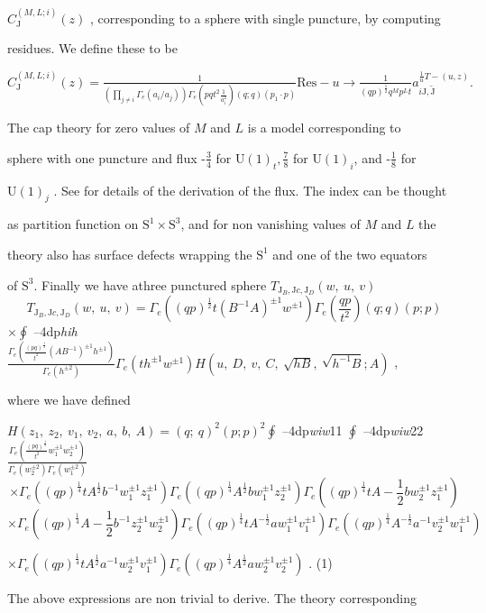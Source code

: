 \documentclass[a4paper,12pt]{article}
\begin{document}
$C_{\mathrm{J}}^{(M,L;i)}(z)$ , corresponding to a sphere with single puncture, by computing

residues. We define these to be

$C_{\mathrm{J}}^{(M,L;i)}(z)=\displaystyle \frac{1}{(\prod_{j\neq i}\Gamma_{e}(a_{i}/a_{j}))\Gamma_{e}(pqt^{2}\frac{1}{a_{i}^{2}})(q;q)(p_{1}\cdot p)}\mathrm{R}\mathrm{e}\mathrm{s} -u\displaystyle \rightarrow\frac{1}{(qp)^{\frac{1}{2}}q^{M}p^{L}t}a_{i\mathrm{J},\tilde{\mathrm{J}}}^{\frac{1}{u}T-(u,z)}.$

The cap theory for zero values of $M$ and $L$ is a model corresponding to

sphere with one puncture and flux -$\displaystyle \frac{3}{4}$ for $\mathrm{U}(1)_{t}, \displaystyle \frac{7}{8}$ for $\mathrm{U}(1)_{i}$, and -$\displaystyle \frac{1}{8}$ for

$\mathrm{U}(1)_{j}$ . See for details of the derivation of the flux. The index can be thought

as partition function on $\mathrm{S}^{1}\times \mathrm{S}^{3}$, and for non vanishing values of $M$ and $L$ the

theory also has surface defects wrapping the $\mathrm{S}^{1}$ and one of the two equators

of $\mathrm{S}^{3}$. Finally we have athree punctured sphere $T_{\mathrm{J}_{B},\mathrm{J}c,\mathrm{J}_{D}}(w,\ u,\ v)$
$$
T_{\mathrm{J}_{B},\mathrm{J}c,\mathrm{J}_{D}}(w,\ u,\ v)=\Gamma_{e}((qp)^{\frac{1}{2}}t(B^{-1}A)^{\pm 1}w^{\pm 1})\Gamma_{e}(\frac{qp}{t^{2}})(q;q)(p;p)
$$
$\displaystyle \times\oint$ --4dp{\it hih} $\displaystyle \frac{\Gamma_{e}(\frac{(pq)^{\frac{1}{2}}}{t^{2}}(AB^{-1})^{\pm 1}h^{\pm 1})}{\Gamma_{e}(h^{\pm 2})}\Gamma_{e}(th^{\pm 1}w^{\pm 1})H(u,\ D,\ v,\ C,\ \sqrt{hB},\ \sqrt{h^{-1}B};A)$ ,

where we have defined

$H (z_{1},\ z_{2},\ v_{1},\ v_{2},\ a,\ b,\ A) = (q;\ q)^{2}(p;p)^{2} \displaystyle \oint$ --4dp{\it wiw}11 $\displaystyle \oint$ --4dp{\it wiw}22 $\displaystyle \frac{\Gamma_{e}(\frac{(pq)^{\frac{1}{2}}}{t^{2}}w_{1}^{\pm 1}w_{2}^{\pm 1})}{\Gamma_{e}(w_{2}^{\pm 2})\Gamma_{e}(w_{1}^{\pm 2})}$
$$
\times\Gamma_{e}((qp)^{\frac{1}{4}}tA^{\frac{1}{2}}b^{-1}w_{1}^{\pm 1}z_{1}^{\pm 1})\Gamma_{e}((qp)^{\frac{1}{4}}A^{\frac{1}{2}}bw_{1}^{\pm 1}z_{2}^{\pm 1})\Gamma_{e}((qp)^{\frac{1}{4}}tA-\frac{1}{2}bw_{2}^{\pm 1}z_{1}^{\pm 1})
$$
$$
\times\Gamma_{e}((qp)^{\frac{1}{4}}A-\frac{1}{2}b^{-1}z_{2}^{\pm 1}w_{2}^{\pm 1})\Gamma_{e}((qp)^{\frac{1}{4}}tA^{-\frac{1}{2}}aw_{1}^{\pm 1}v_{1}^{\pm 1})\Gamma_{e}((qp)^{\frac{1}{4}}A^{-\frac{1}{2}}a^{-1}v_{2}^{\pm 1}w_{1}^{\pm 1})
$$
\begin{center}
$\times\Gamma_{e}((qp)^{\frac{1}{4}}tA^{\frac{1}{2}}a^{-1}w_{2}^{\pm 1}v_{1}^{\pm 1})\Gamma_{e}((qp)^{\frac{1}{4}}A^{\frac{1}{2}}aw_{2}^{\pm 1}v_{2}^{\pm 1})$ . (1)
\end{center}
The above expressions are non trivial to derive. The theory corresponding
\end{document}
